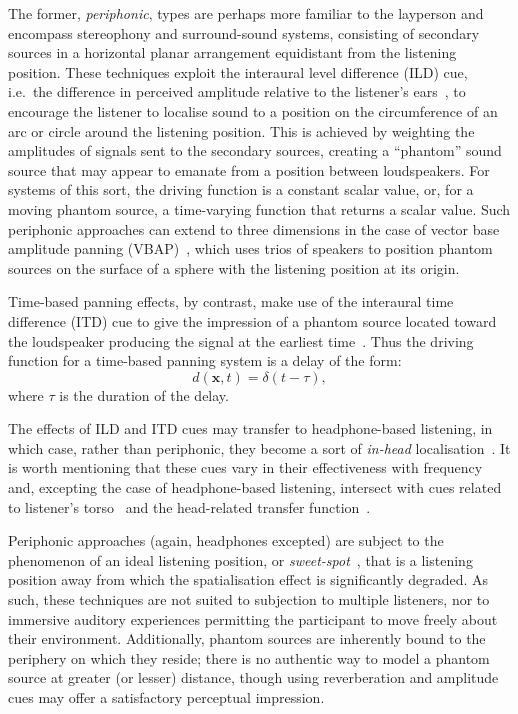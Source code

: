 The former, \textit{periphonic}, types are perhaps more familiar to the
layperson and encompass stereophony and surround-sound systems, consisting of
secondary sources in a horizontal planar arrangement equidistant from the
listening position.
These techniques exploit the interaural level difference (ILD) cue, i.e.\ the
difference in perceived amplitude relative to the listener's
ears~\citep{pulkki_virtual_1997,verheijen_sound_1998,ziemer_wave_2020}, to
encourage the listener to localise sound to a position on the circumference of
an arc or circle around the listening position.
This is achieved by weighting the amplitudes of signals sent to the
secondary sources, creating a ``phantom'' sound source that may appear to
emanate from a position between loudspeakers.
For systems of this sort, the driving function is a constant scalar value, or,
for a moving phantom source, a time-varying function that returns a scalar
value.
Such periphonic approaches can extend to three dimensions in the case of
vector base amplitude panning (VBAP)~\citep{pulkki_virtual_1997}, which uses
trios of speakers to position phantom sources on the surface of a sphere
with the listening position at its origin.

Time-based panning effects, by contrast, make use of the interaural time
difference (ITD) cue to give the impression of a phantom source located toward
the loudspeaker producing the signal at the earliest
time~\citep{pulkki_virtual_1997,verheijen_sound_1998}.
Thus the driving function for a time-based panning system is a delay of the
form:
\begin{equation}
    d(\mathbf{x},t) = \delta(t - \tau),
    \label{eq:time-driving-function}
\end{equation}
where $\tau$ is the duration of the delay.

The effects of ILD and ITD cues may transfer to headphone-based listening,
in which case, rather than periphonic, they become a sort of \textit{in-head}
localisation~\citep{ahrens_analytic_2012}.
It is worth mentioning that these cues vary in their effectiveness with
frequency and, excepting the case of headphone-based listening, intersect with
cues related to listener's torso~\citep{verheijen_sound_1998} and the
head-related transfer
function~\citep{de_poli_physically_1998,geier_object-based_2010}.

Periphonic approaches (again, headphones excepted) are subject to the
phenomenon of an ideal listening position, or
\textit{sweet-spot}~\citep{verheijen_sound_1998,nicol_sound_2017}, that is a
listening position away from which the spatialisation effect is significantly
degraded.
As such, these techniques are not suited to subjection to multiple listeners,
nor to immersive auditory experiences permitting the participant to move freely
about their environment.
Additionally, phantom sources are inherently bound to the periphery on which
they reside;
there is no authentic way to model a phantom source at greater (or lesser)
distance, though using reverberation and amplitude cues may offer a satisfactory
perceptual impression.

